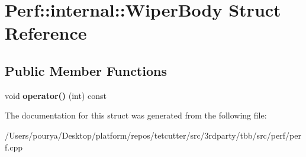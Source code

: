 \hypertarget{structPerf_1_1internal_1_1WiperBody}{}\section{Perf\+:\+:internal\+:\+:Wiper\+Body Struct Reference}
\label{structPerf_1_1internal_1_1WiperBody}
\subsection*{Public Member Functions}
\begin{DoxyCompactItemize}
\item 
\hypertarget{structPerf_1_1internal_1_1WiperBody_a58c294c2d822811827e929a93dccb4d1}{}void {\bfseries operator()} (int) const \label{structPerf_1_1internal_1_1WiperBody_a58c294c2d822811827e929a93dccb4d1}

\end{DoxyCompactItemize}


The documentation for this struct was generated from the following file\+:\begin{DoxyCompactItemize}
\item 
/\+Users/pourya/\+Desktop/platform/repos/tetcutter/src/3rdparty/tbb/src/perf/perf.\+cpp\end{DoxyCompactItemize}
